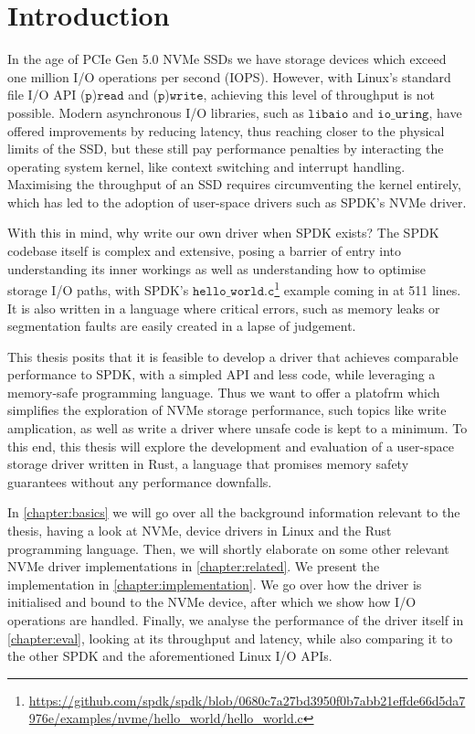 \chapter{Introduction}\label{chapter:introduction}
In the age of PCIe Gen 5.0 NVMe SSDs we have storage devices which exceed one million I/O operations per second (IOPS). However, with Linux's standard file I/O API ($\texttt{p}$)$\texttt{read}$ and ($\texttt{p}$)$\texttt{write}$, achieving this level of throughput is not possible. Modern asynchronous I/O libraries, such as $\texttt{libaio}$ and $\texttt{io\_uring}$, have offered improvements by reducing latency, thus reaching closer to the physical limits of the SSD, but these still pay performance penalties by interacting the operating system kernel, like context switching and interrupt handling\cite{storage_api}. Maximising the throughput of an SSD requires circumventing the kernel entirely, which has led to the adoption of user-space drivers such as SPDK's NVMe driver.

With this in mind, why write our own driver when SPDK exists? The SPDK codebase itself is complex and extensive, posing a barrier of entry into understanding its inner workings as well as understanding how to optimise storage I/O paths, with SPDK's $\texttt{hello\_world.c}$\footnote{\url{https://github.com/spdk/spdk/blob/0680c7a27bd3950f0b7abb21effde66d5da7976e/examples/nvme/hello_world/hello_world.c}} example coming in at 511 lines. It is also written in a language where critical errors, such as memory leaks or segmentation faults are easily created in a lapse of judgement.

This thesis posits that it is feasible to develop a driver that achieves comparable performance to SPDK, with a simpled API and less code, while leveraging a memory-safe programming language. Thus we want to offer a platofrm which simplifies the exploration of NVMe storage performance, such topics like write amplication, as well as write a driver where unsafe code is kept to a minimum. To this end, this thesis will explore the development and evaluation of a user-space storage driver written in Rust, a language that promises memory safety guarantees without any performance downfalls.

In \autoref{chapter:basics} we will go over all the background information relevant to the thesis, having a look at NVMe, device drivers in Linux and the Rust programming language. Then, we will shortly elaborate on some other relevant NVMe driver implementations in \autoref{chapter:related}.
We present the implementation in \autoref{chapter:implementation}. We go over how the driver is initialised and bound to the NVMe device, after which we show how I/O operations are handled.
Finally, we analyse the performance of the driver itself in \autoref{chapter:eval}, looking at its throughput and latency, while also comparing it to the other SPDK and the aforementioned Linux I/O APIs.
